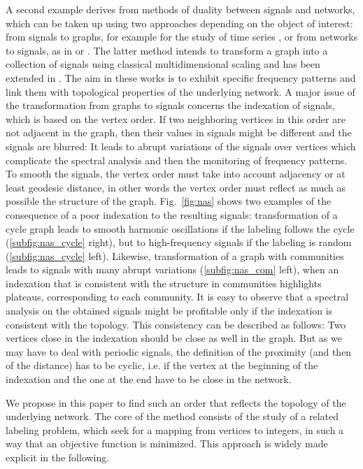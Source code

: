 \documentclass{scrartcl}
\theoremstyle{plain}
\begin{document}
A second example derives from methods of duality between signals and networks, 
which can be taken up using two approaches depending on the object of interest: 
from signals to graphs, for example for the study of time series 
\cite{Campanharo2011}, or from networks to signals, as in \cite{Weng2014} or 
\cite{Shimada2012}. The latter method intends to transform a graph into a 
collection of signals using classical multidimensional scaling \cite{Borg2005} 
and has been extended in \cite{Hamon2013a, Hamon2013b, Hamon2013c, Hamon2014}. 
The aim in these works is to exhibit specific frequency patterns and link them 
with topological properties of the underlying network. A major issue of the 
transformation from graphs to signals concerns the indexation of signals, which 
is based on the vertex order. If two neighboring vertices in this order are not 
adjacent in the graph, then their values in signals might be different and the 
signals are blurred: It leads to abrupt variations of the signals over vertices 
which complicate the spectral analysis and then the monitoring of frequency 
patterns. To smooth the signals, the vertex order must take into account 
adjacency or at least geodesic distance, in other words the vertex order must 
reflect as much as possible the structure of the graph. Fig.~\ref{fig:nas} shows 
two examples of the consequence of a poor indexation to the resulting signals: 
transformation of a cycle graph leads to smooth harmonic oscillations if the 
labeling follows the cycle (\ref{subfig:nas_cycle} right), but to high-frequency 
signals if the labeling is random (\ref{subfig:nas_cycle} left). Likewise, 
transformation of a graph with communities leads to signals with many abrupt 
variations (\ref{subfig:nas_com} left), when an indexation that is consistent 
with the structure in communities highlights plateaus, corresponding to each 
community. It is easy to observe that a spectral analysis on the obtained 
signals might be profitable only if the indexation is consistent with the 
topology. This consistency can be described as follows: Two vertices close in 
the indexation should be close as well in the graph. But as we may have to deal 
with periodic signals, the definition of the proximity (and then of the 
distance) has to be cyclic, i.e. if the vertex at the beginning of the 
indexation and the one at the end have to be close in the network.

We propose in this paper to find such an order that reflects the topology of the 
underlying network. The core of the method consists of the study of a related 
labeling problem, which seek for a mapping from vertices to integers, in such a 
way that an objective function is minimized. This approach is widely made 
explicit in the following.
\end{document}

